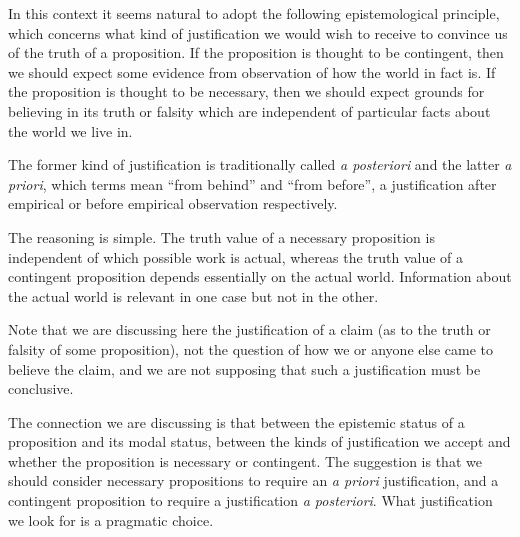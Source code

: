 {In this context it seems natural to adopt the following
epistemological principle, which concerns what kind of justification
we would wish to receive to convince us of the truth of a proposition.
If the proposition is thought to be contingent, then we should expect
some evidence from observation of how the world in fact is.
If the proposition is thought to be necessary, then we should expect
grounds for believing in its truth or falsity which are independent of
particular facts about the world we live in.

The former kind of justification is traditionally called \emph{a
  posteriori} and the latter \emph{a priori}, which terms mean ``from
behind'' and ``from before'', a justification after empirical or
before empirical observation respectively.

The reasoning is simple.
The truth value of a necessary proposition is independent of which
possible work is actual, whereas the truth value of a contingent
proposition depends essentially on the actual world.
Information about the actual world is relevant in one case but not in
the other.

Note that we are discussing here the justification of a claim (as to
the truth or falsity of some proposition), not the
question of how we or anyone else came to believe the claim, and we
are not supposing that such a justification must be conclusive.

The connection we are discussing is that between the epistemic status
of a proposition and its modal status, between the kinds of
justification we accept and whether the proposition is necessary or
contingent.
The suggestion is that we should consider necessary propositions to
require an \emph{a priori} justification, and a contingent proposition
to require a justification \emph{a posteriori}.
What justification we look for is a pragmatic choice.

}%
